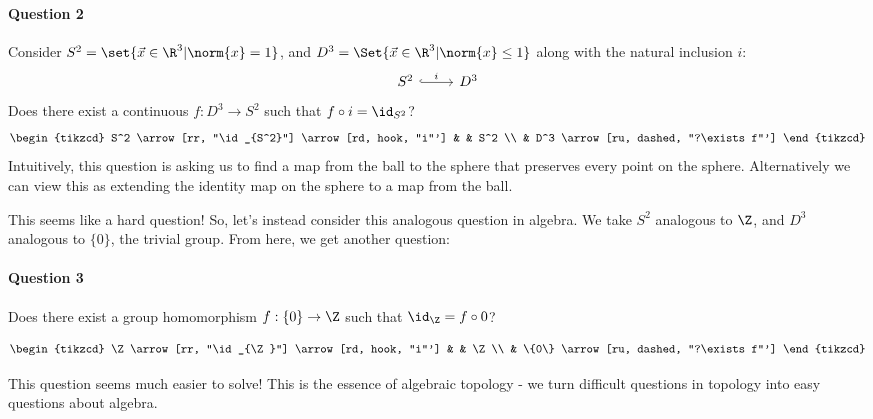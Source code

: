 \documentclass{article}
\numberwithin{nthm}{subsection}
\begin{document}
\paragraph{Question 2}
    Consider $S^2 = \set{\vec{x} \in \R^3 | \norm{x} = 1}$, and $D^3 = \Set{\vec{x} \in \R^3 | \norm{x} \leq 1}$ along with the natural inclusion $i$:
    \begin{equation*}
        \begin{tikzcd}
            S^2 \arrow[r, hook, "i"] & D^3
        \end{tikzcd}
    \end{equation*}
    Does there exist a continuous $f: D^3 \to S^2$ such that $f \circ i = \id_{S^2}$?
    \begin{equation*}
        \begin{tikzcd}
            S^2 \arrow[rr, "\id_{S^2}"] \arrow[rd, hook, "i"'] & & S^2 \\
                                                               & D^3 \arrow[ru, dashed, "?\exists f"']
        \end{tikzcd}
    \end{equation*}
    Intuitively, this question is asking us to find a map from the ball to the sphere that preserves every point on the sphere.
    Alternatively we can view this as extending the identity map on the sphere to a map from the ball.

    This seems like a hard question!  So, let's instead consider this analogous question in algebra.
    We take $S^2$ analogous to $\Z$, and $D^3$ analogous to $\{0\}$, the trivial group. From here, we get another question:

\paragraph{Question 3} Does there exist a group homomorphism $f: \{0\} \to \Z$ such that $\id_\Z = f \circ 0$?

    \begin{equation*}
        \begin{tikzcd}
            \Z \arrow[rr, "\id_{\Z}"] \arrow[rd, hook, "i"'] & & \Z \\
                                                             & \{0\} \arrow[ru, dashed, "?\exists f"']
        \end{tikzcd}
    \end{equation*}

    This question seems much easier to solve! This is the essence of algebraic topology - we turn difficult questions in topology into easy questions about algebra.
\end{document}
